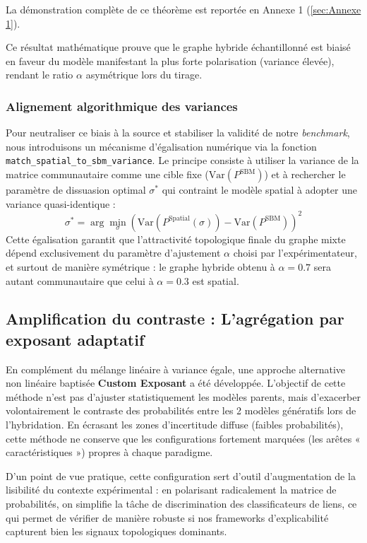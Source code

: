 La démonstration complète de ce théorème est reportée en Annexe 1 (\ref{sec:Annexe 1}).

Ce résultat mathématique prouve que le graphe hybride échantillonné est biaisé en faveur du modèle manifestant la plus forte polarisation (variance élevée), rendant le ratio $\alpha$ asymétrique lors du tirage.

\subsubsection{Alignement algorithmique des variances}
Pour neutraliser ce biais à la source et stabiliser la validité de notre \textit{benchmark}, nous introduisons un mécanisme d'égalisation numérique via la fonction \texttt{match\_spatial\_to\_sbm\_variance}. Le principe consiste à utiliser la variance de la matrice communautaire comme une cible fixe ($\text{Var}(P^{\text{SBM}})$) et à rechercher le paramètre de dissuasion optimal $\sigma^*$ qui contraint le modèle spatial à adopter une variance quasi-identique :
\begin{equation}
    \sigma^* = \arg\min_{\sigma} \left( \text{Var}\left(P^{\text{Spatial}}(\sigma)\right) - \text{Var}\left(P^{\text{SBM}}\right) \right)^2
\end{equation}
Cette égalisation garantit que l'attractivité topologique finale du graphe mixte dépend exclusivement du paramètre d'ajustement $\alpha$ choisi par l'expérimentateur, et surtout de manière symétrique : le graphe hybride obtenu à $\alpha = 0.7$ sera autant communautaire que celui à $\alpha = 0.3$ est spatial.

\subsection{Amplification du contraste : L'agrégation par exposant adaptatif}

En complément du mélange linéaire à variance égale, une approche alternative non linéaire baptisée \textbf{Custom Exposant} a été développée. L'objectif de cette méthode n'est pas d'ajuster statistiquement les modèles parents, mais d'exacerber volontairement le contraste des probabilités entre les 2 modèles génératifs lors de l'hybridation. En écrasant les zones d'incertitude diffuse (faibles probabilités), cette méthode ne conserve que les configurations fortement marquées (les arêtes « caractéristiques ») propres à chaque paradigme. 

D'un point de vue pratique, cette configuration sert d'outil d'augmentation de la lisibilité du contexte expérimental : en polarisant radicalement la matrice de probabilités, on simplifie la tâche de discrimination des classificateurs de liens, ce qui permet de vérifier de manière robuste si nos frameworks d'explicabilité capturent bien les signaux topologiques dominants.

